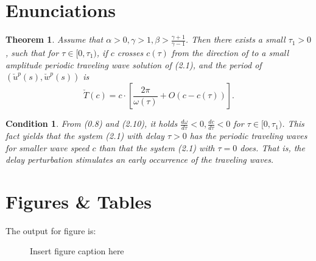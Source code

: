 \documentclass{IET}%
\newtheorem{theorem}{Theorem}
\newtheorem{condition}{Condition}
\begin{document}
\section{Enunciations}




\begin{theorem}\label{T0.1}
Assume that $\alpha>0, \gamma>1, \beta>\frac{\gamma+1}{\gamma-1}$.
Then there exists a small $\tau_1>0$, such that for $\tau\in
[0,\tau_1)$, if $c$ crosses $c(\tau)$ from the direction of
to  a small amplitude periodic traveling wave solution of
(2.1), and the period of $(\check{u}^p(s),\check{w}^p(s))$ is
\[
\check{T}(c)=c\cdot \left[\frac{2\pi}{\omega(\tau)}+O(c-c(\tau))\right].
\]
\end{theorem}


\begin{condition}\label{C2.2}
From (0.8) and (2.10), it holds
$\frac{d\omega}{d\tau}<0,\frac{dc}{d\tau}<0$ for $\tau\in
[0,\tau_1)$. This fact yields that the system (2.1) with delay
$\tau>0$ has the periodic traveling waves for smaller wave speed $c$
than that the system (2.1) with $\tau=0$ does. That is, the
delay perturbation stimulates an early occurrence of the traveling waves.
\end{condition}


\section{Figures \& Tables}

The output for figure is:

\begin{figure}[!h]
\caption{Insert figure caption here
}
\label{fig_sim}
\end{figure}
\end{document}
